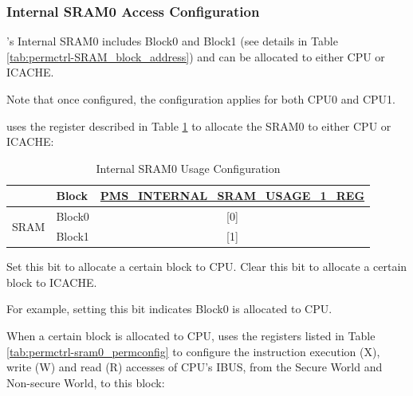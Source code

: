 \documentclass[main\_\_EN.tex]{subfiles}
\begin{document}
\subsubsection{Internal SRAM0 Access Configuration}\label{sec:permctrl_sram0}

\chipname{}'s Internal SRAM0 includes Block0 and Block1 (see details in Table \ref{tab:permctrl-SRAM_block_address}) and can be allocated to either CPU or ICACHE.

Note that once configured, the configuration applies for both CPU0 and CPU1.

\chipname{} uses the register described in Table \ref{tab:permctrl-sram0_accessconfig} to allocate the SRAM0 to either CPU or ICACHE:

\begin{table}[H]
    \centering
    \caption{Internal SRAM0 Usage Configuration}
    \label{tab:permctrl-sram0_accessconfig}
    \begin{threeparttable}
    \begin{tabular}{|l|l|c|}
    \hline
    \rowcolor{lightgray}
                          &\textbf{Block}  & \textbf{\hyperref[regdesc:PMSINTERNALSRAMUSAGE1REG]{PMS\_INTERNAL\_SRAM\_USAGE\_1\_REG\tnote{A}}}\\\hline
    \multirow{2}{*}{SRAM} & Block0        & [0] \tnote{B}\\\cline{2-3}
                          & Block1        & [1] \\\hline
    \end{tabular}
    \begin{tablenotes}
        \item[A] Set this bit to allocate a certain block to CPU. Clear this bit to allocate a certain block to ICACHE.
        \item[B] For example, setting this bit indicates Block0 is allocated to CPU.
        \end{tablenotes}
    \end{threeparttable}
\end{table}

When a certain block is allocated to CPU, \chipname{} uses the registers listed in Table \ref{tab:permctrl-sram0_permconfig} to configure the instruction execution (X), write (W) and read (R) accesses of CPU's IBUS, from the Secure World and Non-secure World, to this block:
\end{document}
